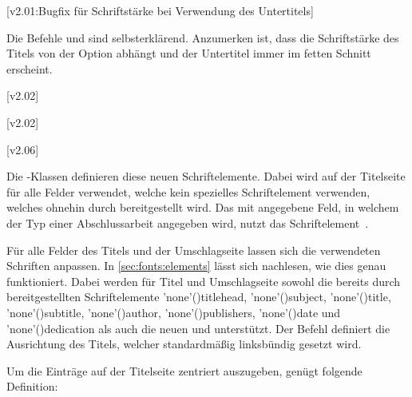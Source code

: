 \begin{DeclareEntity*}{}
\begin{DeclareEntity*}{}
\begin{DeclareEntity*}{}
%
\begin{Declaration}
  {}
\begin{Declaration}
  {}
  [v2.01:Bugfix für Schriftstärke bei Verwendung des Untertitels]
\printdeclarationlist

Die Befehle  und  sind selbsterklärend. Anzumerken 
ist, dass die Schriftstärke des Titels von der Option  abhängt
und der Untertitel immer im fetten Schnitt erscheint. 
\end{Declaration}
\end{Declaration}

\begin{Declaration}
  {}
  [v2.02]
\begin{Declaration}
  {}
  [v2.02]
\begin{Declaration}
  {}
  [v2.06]
\printdeclarationlist[Schriftelemente]

Die \TUDScript-Klassen definieren diese neuen Schriftelemente. Dabei wird 
 auf der Titelseite für alle Felder verwendet, welche kein 
spezielles Schriftelement verwenden, welches ohnehin durch \KOMAScript{} 
bereitgestellt wird. Das mit  angegebene Feld, in welchem der Typ 
einer Abschlussarbeit angegeben wird, nutzt das Schriftelement~. 

%
Für alle Felder des Titels und der Umschlagseite lassen sich die verwendeten
Schriften anpassen. In \autoref{sec:fonts:elements} lässt sich nachlesen, wie 
dies genau funktioniert. Dabei werden für Titel und Umschlagseite sowohl die 
bereits durch \KOMAScript{} bereitgestellten Schriftelemente
\Font'none'(){titlehead}, 
\Font'none'(){subject}, 
\Font'none'(){title}, 
\Font'none'(){subtitle}, 
\Font'none'(){author}, 
\Font'none'(){publishers},
\Font'none'(){date} und 
\Font'none'(){dedication}
als auch die neuen  und  unterstützt.
%
Der Befehl  definiert die Ausrichtung des Titels, welcher 
standardmäßig linksbündig gesetzt wird.
\begin{Example}
Um die Einträge auf der Titelseite zentriert auszugeben, genügt folgende 
Definition:
\begin{Code}
\let\raggedtitle\centering
\end{Code}
\end{Example}
\end{Declaration}
\end{Declaration}
\end{Declaration}


\end{DeclareEntity*}
\end{DeclareEntity*}
\end{DeclareEntity*}
